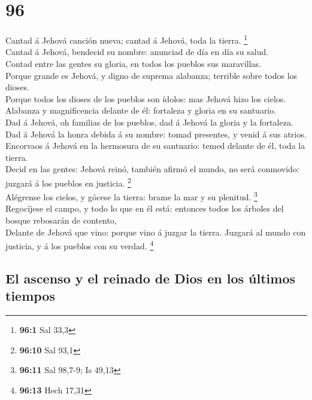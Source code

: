 \hypertarget{section-95}{%
\section{96}\label{section-95}}

 Cantad á Jehová canción nueva; cantad á Jehová, toda la
tierra. \footnote{\textbf{96:1} Sal 33,3}\\
 Cantad á Jehová, bendecid su nombre: anunciad de día en día
su salud.\\
 Contad entre las gentes su gloria, en todos los pueblos sus
maravillas.\\
 Porque grande es Jehová, y digno de suprema alabanza;
terrible sobre todos los dioses.\\
 Porque todos los dioses de los pueblos son ídolos: mas
Jehová hizo los cielos.\\
 Alabanza y magnificencia delante de él: fortaleza y gloria
en su santuario.\\
 Dad á Jehová, oh familias de los pueblos, dad á Jehová la
gloria y la fortaleza.\\
 Dad á Jehová la honra debida á su nombre: tomad presentes,
y venid á sus atrios.\\
 Encorvaos á Jehová en la hermosura de su santuario: temed
delante de él, toda la tierra.\\
 Decid en las gentes: Jehová reinó, también afirmó el
mundo, no será conmovido: juzgará á los pueblos en justicia.
\footnote{\textbf{96:10} Sal 93,1}\\
 Alégrense los cielos, y gócese la tierra: brame la mar y
su plenitud. \footnote{\textbf{96:11} Sal 98,7-9; Is 49,13}\\
 Regocíjese el campo, y todo lo que en él está: entonces
todos los árboles del bosque rebosarán de contento,\\
 Delante de Jehová que vino: porque vino á juzgar la
tierra. Juzgará al mundo con justicia, y á los pueblos con su verdad.
\footnote{\textbf{96:13} Hech 17,31}

\hypertarget{el-ascenso-y-el-reinado-de-dios-en-los-uxfaltimos-tiempos}{%
\subsection{El ascenso y el reinado de Dios en los últimos
tiempos}\label{el-ascenso-y-el-reinado-de-dios-en-los-uxfaltimos-tiempos}}

